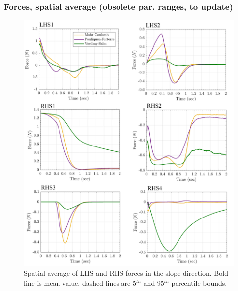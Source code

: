 \documentclass{article}
\begin{document}
\subsubsection{Forces, spatial average (obsolete par. ranges, to update)}
\begin{figure}[H]
        \centering
        \includegraphics[width=1\textwidth]{Figures/Forces_combine.png}
        \caption{Spatial average of LHS and RHS forces in the slope direction. Bold line is mean value, dashed lines are 5$^{th}$ and 95$^{th}$ percentile bounds.}
        \label{fig:Ramp-Fx-spatial}
\end{figure}
\end{document}
